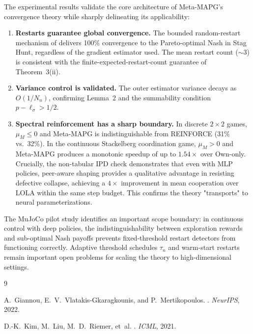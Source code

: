 \documentclass[11pt,a4paper]{article}
\theoremstyle{remark}
\begin{document}
The experimental results validate the core architecture of Meta-MAPG's convergence theory while sharply delineating its applicability:
\begin{enumerate}[itemsep=3pt]
  \item \textbf{Restarts guarantee global convergence.}
    The bounded random-restart mechanism of \citet{Giannou2022} delivers
    100\% convergence to the Pareto-optimal Nash in Stag Hunt,
    regardless of the gradient estimator used.
    The mean restart count ($\sim$3) is consistent with the
    finite-expected-restart-count guarantee of Theorem~3(ii).
  \item \textbf{Variance control is validated.}
    The outer estimator variance decays as $O(1/N_n)$,
    confirming Lemma~2 and the summability condition
    $p - \ell_\sigma > 1/2$.
  \item \textbf{Spectral reinforcement has a sharp boundary.}
    In discrete $2{\times}2$ games, $\mu_M \le 0$ and Meta-MAPG
    is indistinguishable from REINFORCE (31\% vs.\ 32\%).
    In the continuous Stackelberg coordination game, $\mu_M > 0$
    and Meta-MAPG produces a monotonic speedup of up to $1.54\times$
    over Own-only. Crucially, the non-tabular IPD check demonstrates
    that even with MLP policies, peer-aware shaping provides a 
    qualitative advantage in resisting defective collapse, achieving
    a $4\times$ improvement in mean cooperation over LOLA within 
    the same step budget. This confirms the theory "transports" 
    to neural parameterizations.
\end{enumerate}

The MuJoCo pilot study identifies an important scope boundary:
in continuous control with deep policies, the indistinguishability between exploration
rewards and sub-optimal Nash payoffs prevents fixed-threshold restart
detectors from functioning correctly.
Adaptive threshold schedules $\tau_n$ and warm-start restarts remain important open problems for scaling the theory to high-dimensional settings.

\begin{thebibliography}{9}

A.~Giannou, E.~V.~Vlatakis-Gkaragkounis, and P.~Mertikopoulos.
.
\newblock \emph{NeurIPS}, 2022.

D.-K.~Kim, M.~Liu, M.~D.~Riemer, et~al.
.
\newblock \emph{ICML}, 2021.

\end{thebibliography}
\end{document}
